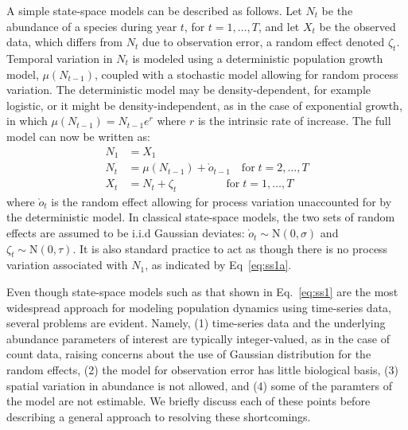 \documentclass[12pt]{article}
\begin{document}
A simple state-space models can be described as follows.
Let $N_t$ be the abundance of a species during year $t$, for
$t=1,\hdots,T$, and let $X_t$ be
the observed data, which differs from $N_t$ due to observation error,
a random effect denoted $\zeta_t$. Temporal variation in $N_t$ is
modeled using a deterministic population growth model, $\mu(N_{t-1})$,
coupled with a stochastic model allowing
for random process variation. %
The deterministic model may be density-dependent, for example
logistic, or it might be density-independent, as in the case of
exponential growth, in which $\mu(N_{t-1}) = N_{t-1}e^{r}$ where $r$
is the intrinsic rate of increase. The full model can now be written
as:
\begin{subequations}
  \label{eq:ss1}
  \begin{align}
    N_1 &= X_1 \label{eq:ss1a} \\
    N_t &= \mu(N_{t-1}) + \grave{o}_{t-1} \quad \text{for} \; t=2,\hdots,T \label{eq:ss1b} \\
    X_t &= N_t + \zeta_t \qquad \qquad \;\, \text{for} \; t=1,\hdots,T \label{eq:ss1c}
  \end{align}
\end{subequations}
where $\grave{o}_t$ is the random effect allowing for process
variation unaccounted for by the deterministic model. In classical
state-space models, the two sets of random effects
are assumed to be i.i.d Gaussian deviates:
$\grave{o}_t \sim \mathrm{N}(0, \sigma)$ and
$\zeta_t \sim \mathrm{N}(0, \tau)$. It is also standard practice to
act as though there is no process variation associated with $N_1$, as
indicated by Eq~\ref{eq:ss1a}.

Even though state-space models such as that shown in Eq.~\ref{eq:ss1}
are the most widespread approach for modeling population dynamics
using time-series data, several problems are evident. Namely, (1)
time-series data and the underlying abundance parameters of interest
are typically integer-valued, as in the case of count data, raising
concerns about the use of Gaussian distribution for the random
effects, (2) the model for observation error has little biological basis, (3)
spatial variation in abundance is not allowed, and (4) some of the
paramters of the model are not estimable. We briefly discuss each of
these points before describing a general approach to resolving these
shortcomings.
\end{document}
